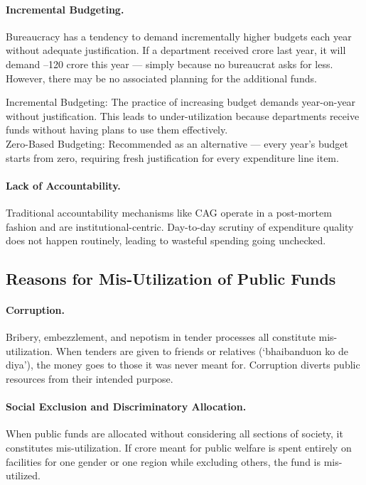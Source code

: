 \paragraph{Incremental Budgeting.} Bureaucracy has a tendency to demand incrementally higher budgets each year without adequate justification. If a department received  crore last year, it will demand --120 crore this year --- simply because no bureaucrat asks for less. However, there may be no associated planning for the additional funds.

\begin{KeyConcept}
Incremental Budgeting: The practice of increasing budget demands year-on-year without justification. This leads to under-utilization because departments receive funds without having plans to use them effectively.\\
Zero-Based Budgeting: Recommended as an alternative --- every year's budget starts from zero, requiring fresh justification for every expenditure line item.
\end{KeyConcept}

\paragraph{Lack of Accountability.} Traditional accountability mechanisms like CAG operate in a post-mortem fashion and are institutional-centric. Day-to-day scrutiny of expenditure quality does not happen routinely, leading to wasteful spending going unchecked.

\subsection{Reasons for Mis-Utilization of Public Funds}

\paragraph{Corruption.} Bribery, embezzlement, and nepotism in tender processes all constitute mis-utilization. When tenders are given to friends or relatives (`bhaibanduon ko de diya'), the money goes to those it was never meant for. Corruption diverts public resources from their intended purpose.

\paragraph{Social Exclusion and Discriminatory Allocation.} When public funds are allocated without considering all sections of society, it constitutes mis-utilization. If  crore meant for public welfare is spent entirely on facilities for one gender or one region while excluding others, the fund is mis-utilized.

